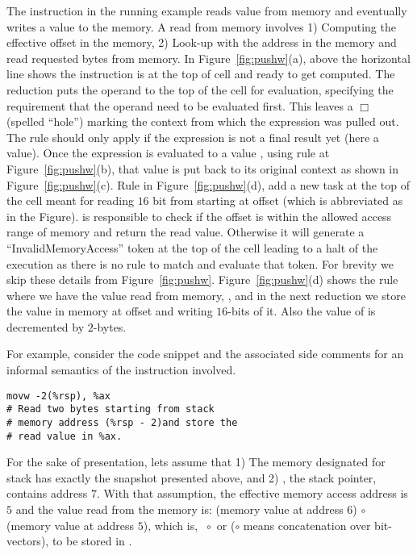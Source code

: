 The instruction in the running example reads value from memory and eventually writes a value to the memory. A read from memory involves 1) Computing the effective offset in the memory, 2) Look-up with the address in the memory and  read requested bytes from memory.  
In Figure~\ref{fig:pushw}(a),  above the horizontal line shows the instruction is at the top of  cell and ready to get computed. The reduction puts the operand  to the top of the cell for evaluation, specifying the requirement that the operand need to be evaluated first. This leaves a $\Box$ (spelled ``hole'') marking the context 
from which the expression  was pulled out. The rule should only apply
if the expression is not a final result yet (here a  value). Once the expression is evaluated to a  value , using rule at Figure~\ref{fig:pushw}(b), that value is put back to its original context as shown in Figure~\ref{fig:pushw}(c). Rule in Figure~\ref{fig:pushw}(d), add a new task at the top of the  cell meant for reading $16$ bit from  starting at offset  (which is abbreviated as  in the Figure).  is responsible to check if the offset  is within the allowed access range of memory and return the read value. Otherwise it will generate a ``InvalidMemoryAccess'' token at the top of the  cell leading to a halt of the \K execution as there is no rule to match and evaluate that token. For brevity we skip these details from Figure~\ref{fig:pushw}.  Figure~\ref{fig:pushw}(d) shows the rule where we have the value read from memory, , and in the next reduction we store the value in memory at offset  and writing $16$-bits of it. Also the value of  is decremented by $2$-bytes. 



For example, consider the code snippet and the associated side comments for an informal semantics of the instruction involved. 
\begin{lstlisting}[style=Bash, caption={Memory Read}, label={lst:CS3}]
movw -2(%rsp), %ax 
# Read two bytes starting from stack  
# memory address (%rsp - 2)and store the  
# read value in %ax.
\end{lstlisting}
For the sake of presentation, lets assume that 1) The memory designated for stack has exactly  the  snapshot presented above, and 2) , the stack pointer, contains address $7$. With that assumption, the effective memory access address is $5$ and the value read from the memory is: (memory value at address $6$) $\circ$ (memory value at address $5$), which is,  $\;\circ$  or ($\circ$ means concatenation over bit-vectors), to be stored in . 





